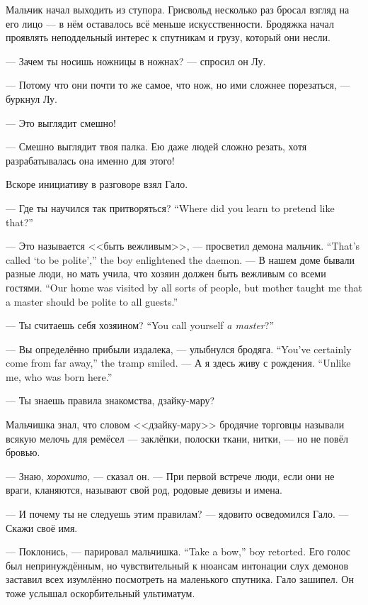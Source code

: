 Мальчик начал выходить из ступора.
Грисвольд несколько раз бросал взгляд на его лицо --- в нём оставалось всё меньше искусственности.
Бродяжка начал проявлять неподдельный интерес к спутникам и грузу, который они несли.

--- Зачем ты носишь ножницы в ножнах? --- спросил он Лу.

--- Потому что они почти то же самое, что нож, но ими сложнее порезаться, --- буркнул Лу.

--- Это выглядит смешно!

--- Смешно выглядит твоя палка.
Ею даже людей сложно резать, хотя разрабатывалась она именно для этого!

Вскоре инициативу в разговоре взял Гало.

{--- Где ты научился так притворяться?}
{``Where did you learn to pretend like that?''}

{--- Это называется <<быть вежливым>>, --- просветил демона мальчик.}
{``That's called `to be polite','' the boy enlightened the daemon.}
{--- В нашем доме бывали разные люди, но мать учила, что хозяин должен быть вежливым со всеми гостями.}
{``Our home was visited by all sorts of people, but mother taught me that a master should be polite to all guests.''}

{--- Ты считаешь себя хозяином?}
{``You call yourself \emph{a master}?''}

{--- Вы определённо прибыли издалека, --- улыбнулся бродяга.}
{``You've certainly come from far away,'' the tramp smiled.}
{--- А я здесь живу с рождения.}
{``Unlike me, who was born here.''}

--- Ты знаешь правила знакомства, дзайку-мару?

Мальчишка знал, что словом <<дзайку-мару>> бродячие торговцы называли всякую мелочь для ремёсел --- заклёпки, полоски ткани, нитки, --- но не повёл бровью.

--- Знаю, \emph{хорохито}, --- сказал он.
--- При первой встрече люди, если они не враги, кланяются, называют свой род, родовые девизы и имена.

--- И почему ты не следуешь этим правилам? --- ядовито осведомился Гало.
--- Скажи своё имя.

{--- Поклонись, --- парировал мальчишка.}
{``Take a bow,'' boy retorted.}
Его голос был непринуждённым, но чувствительный к нюансам интонации слух демонов заставил всех изумлённо посмотреть на маленького спутника.
Гало зашипел.
Он тоже услышал оскорбительный ультиматум.


